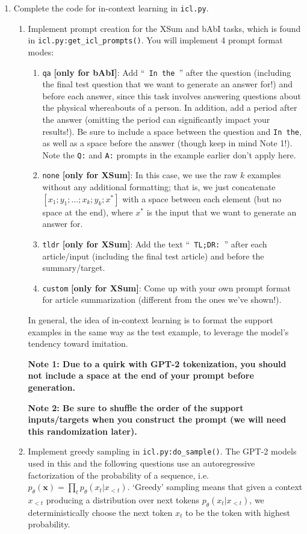 \documentclass[12pt]{article}
\begin{document}
\begin{enumerate}
    \item Complete the code for in-context learning in \texttt{icl.py}.
    \begin{enumerate}
        \item Implement prompt creation for the XSum and bAbI tasks, which is found in \texttt{icl.py:get\_icl\_prompts()}. You will implement 4 prompt format modes:
        \begin{enumerate}
            \item \texttt{qa} \textbf{[only for bAbI]}: Add ``\texttt{ In the }'' after the question (including the final test question that we want to generate an answer for!) and before each answer, since this task involves answering questions about the physical whereabouts of a person. In addition, add a period after the answer (omitting the period can significantly impact your results!). Be sure to include a space between the question and \texttt{In the}, as well as a space before the answer (though keep in mind Note 1!). Note the  \texttt{Q:} and \texttt{A:} prompts in the example earlier don't apply here.
            \item \texttt{none} \textbf{[only for XSum]}: In this case, we use the raw $k$ examples without any additional formatting; that is, we just concatenate $[x_1; y_1; ... ; \allowbreak x_k; y_k; x^*]$ with a space between each element (but no space at the end), where $x^*$ is the input that we want to generate an answer for.
            \item \texttt{tldr} \textbf{[only for XSum]}: Add the text ``\texttt{ TL;DR: }'' after each article/input (including the final test article) and before the summary/target.
            \item \texttt{custom} \textbf{[only for XSum]}: Come up with your own prompt format for article summarization (different from the ones we've shown!).
        \end{enumerate}
        In general, the idea of in-context learning is to format the support examples in the same way as the test example, to leverage the model's tendency toward imitation.

        \textbf{Note 1: Due to a quirk with GPT-2 tokenization, you should not include a space at the end of your prompt before generation.}
        
        \textbf{Note 2: Be sure to shuffle the order of the support inputs/targets when you construct the prompt (we will need this randomization later).}
        \item Implement greedy sampling in \texttt{icl.py:do\_sample()}. The GPT-2 models used in this and the following questions use an autoregressive factorization of the probability of a sequence, i.e. $p_\theta(\mathbf{x}) = \prod_t p_\theta(x_t|x_{<t})$. `Greedy' sampling means that given a context $x_{<t}$ producing a distribution over next tokens $p_\theta(x_t|x_{<t})$, we deterministically choose the next token $x_t$ to be the token with highest probability.
        

\end{enumerate}
\end{enumerate}
\end{document}
